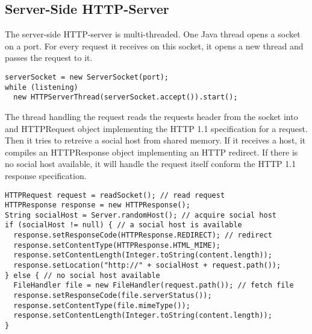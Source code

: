 \documentclass[a4paper, 10pt]{article}
\begin{document}
\subsection{Server-Side HTTP-Server}
The server-side HTTP-server is multi-threaded. One Java thread opens a socket on a port. For every request it receives on this socket, it opens a new thread and passes the request to it. 
\begin{lstlisting}
serverSocket = new ServerSocket(port);
while (listening)
  new HTTPServerThread(serverSocket.accept()).start();
\end{lstlisting}
The thread handling the request reads the requests header from the socket into and HTTPRequest object implementing the HTTP 1.1 specification for a request. Then it tries to retreive a social host from shared memory. If it receives a host, it compiles an HTTPResponse object implementing an HTTP redirect. If there is no social host available, it will handle the request itself conform the HTTP 1.1 response specification.
\begin{lstlisting}
HTTPRequest request = readSocket(); // read request
HTTPResponse response = new HTTPResponse();
String socialHost = Server.randomHost(); // acquire social host
if (socialHost != null) { // a social host is available
  response.setResponseCode(HTTPResponse.REDIRECT); // redirect
  response.setContentType(HTTPResponse.HTML_MIME);
  response.setContentLength(Integer.toString(content.length));
  response.setLocation("http://" + socialHost + request.path());
} else { // no social host available
  FileHandler file = new FileHandler(request.path()); // fetch file
  response.setResponseCode(file.serverStatus());
  response.setContentType(file.mimeType());
  response.setContentLength(Integer.toString(content.length));
}
\end{lstlisting}
\end{document}

